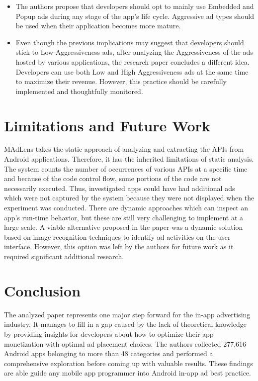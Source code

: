 \documentclass[conference]{IEEEtran}
\begin{document}
\begin{itemize}
\item The authors propose that developers should opt to mainly use Embedded and Popup ads during any stage of the app's life cycle. Aggressive ad types should be used when their application becomes more mature.
\item Even though the previous implications may suggest that developers should stick to Low-Aggressiveness ads, after analyzing the Aggressiveness of the ads hosted by various applications, the research paper concludes a different idea. Developers can use both Low and High Aggressiveness ads at the same time to maximize their revenue. However, this practice should be carefully implemented and thoughtfully monitored.
\end{itemize}
\section{Limitations and Future Work}
\label{SectionSix}
MAdLens takes the static approach of analyzing and extracting the APIs from Android applications. Therefore, it has the inherited limitations of static analysis. The system counts the number of occurrences of various APIs at a specific time and because of the code control flow, some portions of the code are not necessarily executed. Thus, investigated apps could have had additional ads which were not captured by the system because they were not displayed when the experiment was conducted. There are dynamic approaches which can inspect an app’s run-time behavior, but these are still very challenging to implement at a large scale. A viable alternative proposed in the paper was a dynamic solution based on image recognition techniques to identify ad activities on the user interface. However, this option was left by the authors for future work as it required significant additional research.

\section{Conclusion}
\label{SectionSeven}
The analyzed paper represents one major step forward for the in-app advertising industry. It manages to fill in a gap caused by the lack of theoretical knowledge by providing insights for developers about how to optimize their app monetization with optimal ad placement choices. The authors collected 277,616 Android apps belonging to more than 48 categories and performed a comprehensive exploration before coming up with valuable results. These findings are able guide any mobile app programmer into Android in-app ad best practice.





\end{document}

